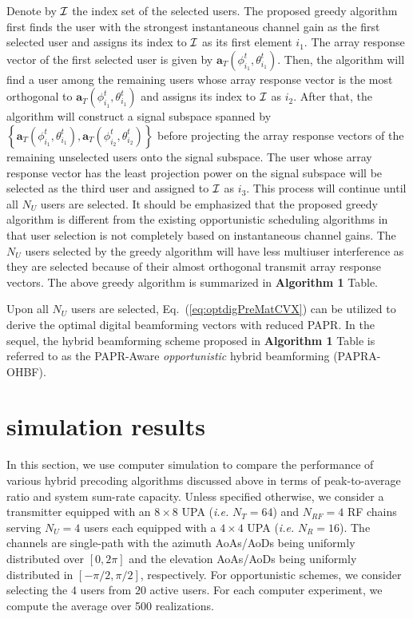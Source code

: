 \documentclass[conference]{IEEEtran}
\begin{document}
Denote by $\cal{I}$ the index set of the selected users. The proposed greedy algorithm first finds the user with the strongest instantaneous channel gain as the first selected user and assigns its index to $\cal{I}$ as its first element $i_1$. The array response vector of the first selected user is given by $\bm{a}_{T}\left(\phi^t_{i_1},\theta^t_{i_1}\right)$. Then, the algorithm will find a user among the remaining users whose array response vector is the most orthogonal to $\bm{a}_{T}\left(\phi^t_{i_1},\theta^t_{i_1}\right)$ and assigns its index to $\cal{I}$ as $i_2$. After that, the algorithm will construct a signal subspace spanned by $\left\{\bm{a}_{T}\left(\phi^t_{i_1},\theta^t_{i_1}\right),\bm{a}_{T}\left(\phi^t_{i_2},\theta^t_{i_2}\right)\right\}$ before projecting the array response vectors of the remaining unselected users onto the signal subspace. The user whose array response vector has the least projection power on the signal subspace will be selected as the third user and assigned to $\cal{I}$ as $i_3$. This process will continue until all $N_U$ users are selected. It should be emphasized that the proposed greedy algorithm is different from the existing opportunistic scheduling algorithms in that user selection is not completely based on instantaneous channel gains\cite{Viswanath2002}. The $N_U$ users selected by the greedy algorithm will have less multiuser interference as they are selected because of their almost orthogonal transmit array response vectors. The above greedy algorithm is summarized in {\bf Algorithm 1} Table.

Upon all $N_U$ users are selected, Eq.~(\ref{eq:optdigPreMatCVX}) can be utilized to derive the optimal digital beamforming vectors with reduced PAPR. In the sequel, the hybrid beamforming scheme proposed in {\bf Algorithm 1} Table is referred to as the PAPR-Aware {\em opportunistic} hybrid beamforming (PAPRA-OHBF).



\section{simulation results}
In this section, we use computer simulation to compare the performance of various hybrid precoding algorithms discussed above in terms of peak-to-average ratio and system sum-rate capacity. Unless specified otherwise, we consider a transmitter equipped with an $8\times 8$ UPA ({\em i.e.} $N_T=64$) and $N_{RF}=4$ RF chains serving $N_U=4$ users each equipped with a $4\times 4$ UPA ({\em i.e.} $N_R=16$). The channels are single-path with the azimuth AoAs/AoDs being uniformly distributed over $[0, 2\pi]$ and the elevation AoAs/AoDs being uniformly distributed in $[-\pi/2, \pi/2]$, respectively. For opportunistic schemes, we consider selecting the $4$ users from $20$ active users. For each computer experiment, we compute the average over 500 realizations.
\end{document}
